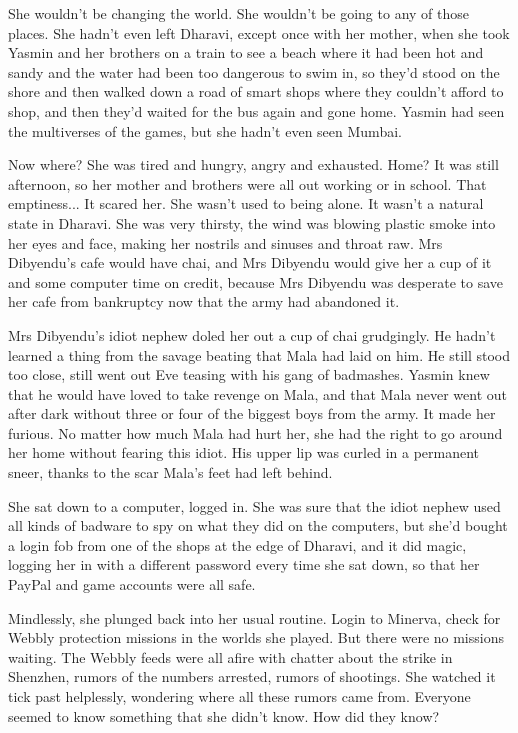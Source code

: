 She wouldn't be changing the world. She wouldn't be going to any of
those places. She hadn't even left Dharavi, except once with her
mother, when she took Yasmin and her brothers on a train to see a
beach where it had been hot and sandy and the water had been too
dangerous to swim in, so they'd stood on the shore and then walked
down a road of smart shops where they couldn't afford to shop, and
then they'd waited for the bus again and gone home. Yasmin had seen
the multiverses of the games, but she hadn't even seen Mumbai.

Now where? She was tired and hungry, angry and exhausted. Home? It
was still afternoon, so her mother and brothers were all out
working or in school. That emptiness... It scared her. She wasn't
used to being alone. It wasn't a natural state in Dharavi. She was
very thirsty, the wind was blowing plastic smoke into her eyes and
face, making her nostrils and sinuses and throat raw. Mrs
Dibyendu's cafe would have chai, and Mrs Dibyendu would give her a
cup of it and some computer time on credit, because Mrs Dibyendu
was desperate to save her cafe from bankruptcy now that the army
had abandoned it.

Mrs Dibyendu's idiot nephew doled her out a cup of chai grudgingly.
He hadn't learned a thing from the savage beating that Mala had
laid on him. He still stood too close, still went out Eve teasing
with his gang of badmashes. Yasmin knew that he would have loved to
take revenge on Mala, and that Mala never went out after dark
without three or four of the biggest boys from the army. It made
her furious. No matter how much Mala had hurt her, she had the
right to go around her home without fearing this idiot. His upper
lip was curled in a permanent sneer, thanks to the scar Mala's feet
had left behind.

She sat down to a computer, logged in. She was sure that the idiot
nephew used all kinds of badware to spy on what they did on the
computers, but she'd bought a login fob from one of the shops at
the edge of Dharavi, and it did magic, logging her in with a
different password every time she sat down, so that her PayPal and
game accounts were all safe.

Mindlessly, she plunged back into her usual routine. Login to
Minerva, check for Webbly protection missions in the worlds she
played. But there were no missions waiting. The Webbly feeds were
all afire with chatter about the strike in Shenzhen, rumors of the
numbers arrested, rumors of shootings. She watched it tick past
helplessly, wondering where all these rumors came from. Everyone
seemed to know something that she didn't know. How did they know?

